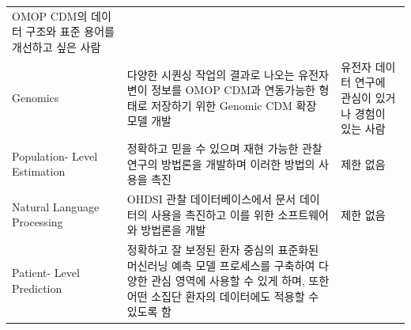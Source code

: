 \documentclass[10.5pt]{book}
\theoremstyle{definition}
\theoremstyle{definition}
\theoremstyle{definition}
\theoremstyle{remark}
\begin{document}
\begin{longtable}[]{@{}lll@{}}
\begin{minipage}[t]{0.37\columnwidth}
OMOP CDM의 데이터 구조와 표준 용어를 개선하고 싶은 사람\strut
\end{minipage}\tabularnewline
\begin{minipage}[t]{0.11\columnwidth}\raggedright\strut
Genomics\strut
\end{minipage} & \begin{minipage}[t]{0.44\columnwidth}\raggedright\strut
다양한 시퀀싱 작업의 결과로 나오는 유전자 변이 정보를 OMOP CDM과
연동가능한 형태로 저장하기 위한 Genomic CDM 확장 모델 개발\strut
\end{minipage} & \begin{minipage}[t]{0.37\columnwidth}\raggedright\strut
유전자 데이터 연구에 관심이 있거나 경험이 있는 사람\strut
\end{minipage}\tabularnewline
\begin{minipage}[t]{0.11\columnwidth}\raggedright\strut
Population- Level Estimation\strut
\end{minipage} & \begin{minipage}[t]{0.44\columnwidth}\raggedright\strut
정확하고 믿을 수 있으며 재현 가능한 관찰 연구의 방법론을 개발하며 이러한
방법의 사용을 촉진\strut
\end{minipage} & \begin{minipage}[t]{0.37\columnwidth}\raggedright\strut
제한 없음\strut
\end{minipage}\tabularnewline
\begin{minipage}[t]{0.11\columnwidth}\raggedright\strut
Natural Language Processing\strut
\end{minipage} & \begin{minipage}[t]{0.44\columnwidth}\raggedright\strut
OHDSI 관찰 데이터베이스에서 문서 데이터의 사용을 촉진하고 이를 위한
소프트웨어와 방법론을 개발\strut
\end{minipage} & \begin{minipage}[t]{0.37\columnwidth}\raggedright\strut
제한 없음\strut
\end{minipage}\tabularnewline
\begin{minipage}[t]{0.11\columnwidth}\raggedright\strut
Patient- Level Prediction\strut
\end{minipage} & \begin{minipage}[t]{0.44\columnwidth}\raggedright\strut
정확하고 잘 보정된 환자 중심의 표준화된 머신러닝 예측 모델 프로세스를
구축하여 다양한 관심 영역에 사용할 수 있게 하며, 또한 어떤 소집단 환자의
데이터에도 적용할 수 있도록 함\strut
\end{minipage} & \begin{minipage}[t]{0.37\columnwidth}\raggedright\strut

\end{minipage}
\end{longtable}
\end{document}
